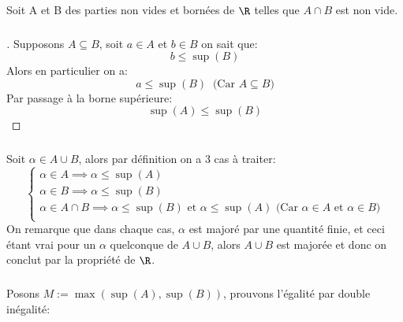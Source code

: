 \section[Demonstrations]{}

\subsection[Ensembles \& majorations]{}
Soit A et B des parties non vides et bornées de \(\R\) telles que \(A \cap B\) est non vide.
\subsubsection*{}
\begin{proof}[\unskip\nopunct]
   Supposons \(A \subseteq B\), soit \(a \in A\) et \(b \in B\) on sait que:
   \[
      b \leq \sup(B)    
   \]
   Alors en particulier on a:
   \[
      a \leq \sup(B) \;\; \text{(Car \(A \subseteq B\))} 
   \]
   Par passage à la borne supérieure:
   \[
      \sup(A) \leq \sup(B)    
   \]
\end{proof}

\subsubsection*{}
Soit \(\alpha \in A \cup B\), alors par définition on a 3 cas à traiter:
\[
   \begin{cases}
      \alpha \in A \implies \alpha \leq \sup(A)\\
      \alpha \in B \implies \alpha \leq \sup(B)\\
      \alpha \in A \cap B \implies \alpha \leq \sup(B) \text{ et }\alpha \leq \sup(A) \text{ (Car \(\alpha \in A\) et \(\alpha \in B\))}\\
   \end{cases}
\]
On remarque que dans chaque cas, \(\alpha\) est majoré par une quantité finie, et ceci étant vrai pour un \(\alpha\) quelconque de \(A \cup B\), alors \(A \cup B\) est majorée et donc on conclut par la propriété de \(\R\).

\subsubsection*{}
Posons \(M := \max(\sup(A), \sup(B))\), prouvons l'égalité par double inégalité:

